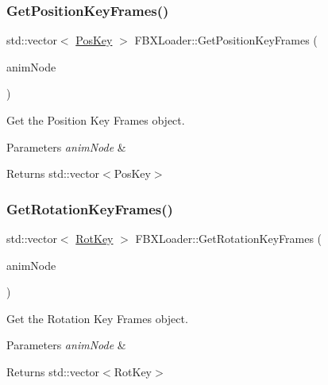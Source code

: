 \subsubsection{\texorpdfstring{Get\+Position\+Key\+Frames()}{GetPositionKeyFrames()}}
{\footnotesize\ttfamily std\+::vector$<$ \hyperlink{structPosKey}{Pos\+Key} $>$ F\+B\+X\+Loader\+::\+Get\+Position\+Key\+Frames (\begin{DoxyParamCaption}\item[{ai\+Node\+Anim $\ast$}]{anim\+Node }\end{DoxyParamCaption})}



Get the Position Key Frames object. 


\begin{DoxyParams}{Parameters}
{\em anim\+Node} & \\
\hline
\end{DoxyParams}
\begin{DoxyReturn}{Returns}
std\+::vector$<$\+Pos\+Key$>$ 
\end{DoxyReturn}
\mbox{\label{namespaceFBXLoader_ac2d362a5987d378985fc830901774b2f}} 
\subsubsection{\texorpdfstring{Get\+Rotation\+Key\+Frames()}{GetRotationKeyFrames()}}
{\footnotesize\ttfamily std\+::vector$<$ \hyperlink{structRotKey}{Rot\+Key} $>$ F\+B\+X\+Loader\+::\+Get\+Rotation\+Key\+Frames (\begin{DoxyParamCaption}\item[{ai\+Node\+Anim $\ast$}]{anim\+Node }\end{DoxyParamCaption})}



Get the Rotation Key Frames object. 


\begin{DoxyParams}{Parameters}
{\em anim\+Node} & \\
\hline
\end{DoxyParams}
\begin{DoxyReturn}{Returns}
std\+::vector$<$\+Rot\+Key$>$ 
\end{DoxyReturn}
\mbox{\label{namespaceFBXLoader_a09106d8a6aa754730867873b6cc1625f}} 
